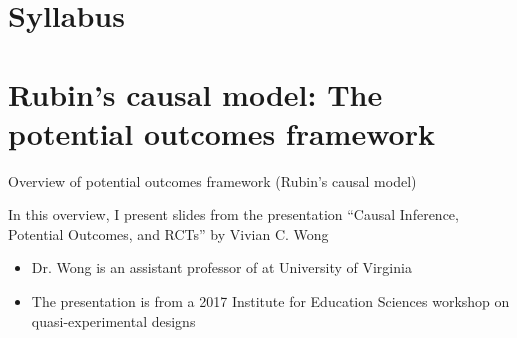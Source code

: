 \section[Syllabus]{Syllabus}

\section[Rubin's causal model]{Rubin's causal model: The potential outcomes framework}

\begin{frame}{Overview of potential outcomes framework (Rubin's causal model)}

	In this overview, I present slides from the presentation ``Causal Inference, Potential Outcomes, and RCTs'' by Vivian C. Wong
	\vspace{2mm}
	\begin{itemize}
		\item Dr. Wong is an assistant professor of at University of Virginia
		\item The presentation is from a 2017 Institute for Education Sciences workshop on quasi-experimental designs

	\end{itemize}
\end{frame}

